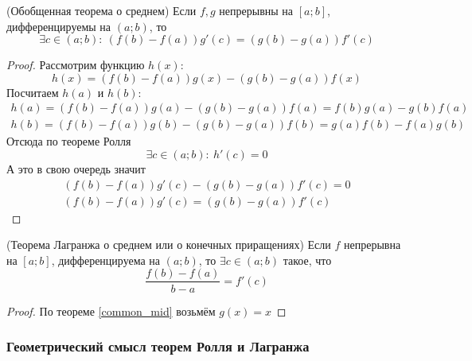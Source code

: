 \begin{theorem} (Обобщенная теорема о среднем)
	\label{common_mid}
	Если $f, g$ непрерывны на $[a; b]$,
	дифференцируемы на $(a; b)$, то
	\[
		\exists c \in (a; b) :\ (f(b) - f(a))g'(c) =
		(g(b) - g(a))f'(c)
	\]
\end{theorem}

\begin{proof}
	Рассмотрим функцию $h(x)$:
	\[
		h(x) = (f(b) - f(a))g(x) - (g(b) - g(a))f(x)
	\]
	Посчитаем $h(a)$ и $h(b)$:
	\begin{align*}
		h(a) = (f(b) - f(a))g(a) - (g(b) - g(a))f(a) =
		f(b)g(a) - g(b)f(a)
		\\
		h(b) = (f(b) - f(a))g(b) - (g(b) - g(a))f(b) =
		g(a)f(b) - f(a)g(b)
	\end{align*}
	Отсюда по теореме Ролля
	\[
		\exists c \in (a; b) :\ h'(c) = 0
	\]
	А это в свою очередь значит
	\begin{align*}
		(f(b) - f(a))g'(c) - (g(b) - g(a))f'(c) = 0
		\\
		(f(b) - f(a))g'(c) = (g(b) - g(a))f'(c)
	\end{align*}
\end{proof}

\begin{corollary} (Теорема Лагранжа о среднем или о
	конечных приращениях)
	Если $f$ непрерывна на $[a; b]$, дифференцируема на
	$(a; b)$, то $\exists c \in (a; b)$ такое, что
	\[
		\frac{f(b) - f(a)}{b - a} = f'(c)
	\]
\end{corollary}

\begin{proof}
	По теореме \ref{common_mid} возьмём $g(x) = x$
\end{proof}

\subsubsection*{Геометрический смысл теорем Ролля и Лагранжа}

